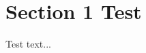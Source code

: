 \documentclass[a4paper]{article}
\begin{document}


\section{Section 1 Test}

Test text...
\end{document}
